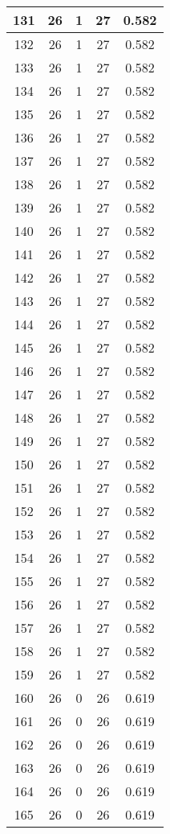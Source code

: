 \documentclass[letterpaper, 12pt]{article}
\begin{document}
\begin{longtable}{|c|c|c|c|c|}
\hline
131 & 26 & 1 & 27 & 0.582 \\
\hline
132 & 26 & 1 & 27 & 0.582 \\
\hline
133 & 26 & 1 & 27 & 0.582 \\
\hline
134 & 26 & 1 & 27 & 0.582 \\
\hline
135 & 26 & 1 & 27 & 0.582 \\
\hline
136 & 26 & 1 & 27 & 0.582 \\
\hline
137 & 26 & 1 & 27 & 0.582 \\
\hline
138 & 26 & 1 & 27 & 0.582 \\
\hline
139 & 26 & 1 & 27 & 0.582 \\
\hline
140 & 26 & 1 & 27 & 0.582 \\
\hline
141 & 26 & 1 & 27 & 0.582 \\
\hline
142 & 26 & 1 & 27 & 0.582 \\
\hline
143 & 26 & 1 & 27 & 0.582 \\
\hline
144 & 26 & 1 & 27 & 0.582 \\
\hline
145 & 26 & 1 & 27 & 0.582 \\
\hline
146 & 26 & 1 & 27 & 0.582 \\
\hline
147 & 26 & 1 & 27 & 0.582 \\
\hline
148 & 26 & 1 & 27 & 0.582 \\
\hline
149 & 26 & 1 & 27 & 0.582 \\
\hline
150 & 26 & 1 & 27 & 0.582 \\
\hline
151 & 26 & 1 & 27 & 0.582 \\
\hline
152 & 26 & 1 & 27 & 0.582 \\
\hline
153 & 26 & 1 & 27 & 0.582 \\
\hline
154 & 26 & 1 & 27 & 0.582 \\
\hline
155 & 26 & 1 & 27 & 0.582 \\
\hline
156 & 26 & 1 & 27 & 0.582 \\
\hline
157 & 26 & 1 & 27 & 0.582 \\
\hline
158 & 26 & 1 & 27 & 0.582 \\
\hline
159 & 26 & 1 & 27 & 0.582 \\
\hline
160 & 26 & 0 & 26 & 0.619 \\
\hline
161 & 26 & 0 & 26 & 0.619 \\
\hline
162 & 26 & 0 & 26 & 0.619 \\
\hline
163 & 26 & 0 & 26 & 0.619 \\
\hline
164 & 26 & 0 & 26 & 0.619 \\
\hline
165 & 26 & 0 & 26 & 0.619 \\

\end{longtable}
\end{document}
